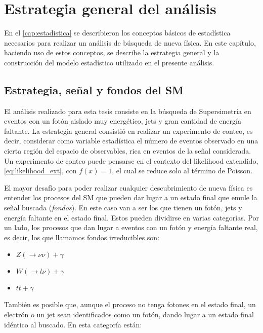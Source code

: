 \chapter{Estrategia general del análisis}
\label{cap:estrategia}

En el \cref{cap:estadistica} se describieron los conceptos básicos de estadística
necesarios para realizar un análisis de búsqueda de nueva física. En este
capítulo, haciendo uso de estos conceptos, se describe la estrategia general
y la construcción del modelo estadístico utilizado en el presente análisis.



\section{Estrategia, señal y fondos del SM}

El análisis realizado para esta tesis consiste en la búsqueda de Supersimetría en
eventos con un fotón aislado muy energético, jets y gran cantidad de energía
faltante. La estrategia general consistió en realizar un experimento de conteo,
es decir, considerar como variable estadística el número de eventos observado en
una cierta región del espacio de observables, rica en eventos de la señal considerada.
Un experimento de conteo puede
pensarse en el contexto del likelihood extendido, \cref{eq:likelihood_ext}, con
$f(x) = 1$, el cual se reduce solo al término de Poisson.

El mayor desafío para poder realizar cualquier descubrimiento de nueva física es
entender los procesos del SM que pueden dar lugar a un estado final que emule
la señal buscada (\emph{fondos}).
En este caso van a ser los que tienen un fotón, jets y energía faltante en el estado final.
Estos pueden dividirse en varias categorías.
Por un lado, los procesos que dan lugar a eventos con un fotón y energía
faltante real, es decir, los que llamamos fondos irreducibles son:

\begin{itemize}
\item $Z(\to\nu\nu)+\gamma$
\item $W(\to l\nu)+\gamma$
\item $t\bar{t}+\gamma$
\end{itemize}
%
También es posible que, aunque el proceso no tenga fotones en el estado final, un
electrón o un jet sean identificados como un fotón, dando lugar a un estado final
idéntico al buscado. En esta categoría están:

